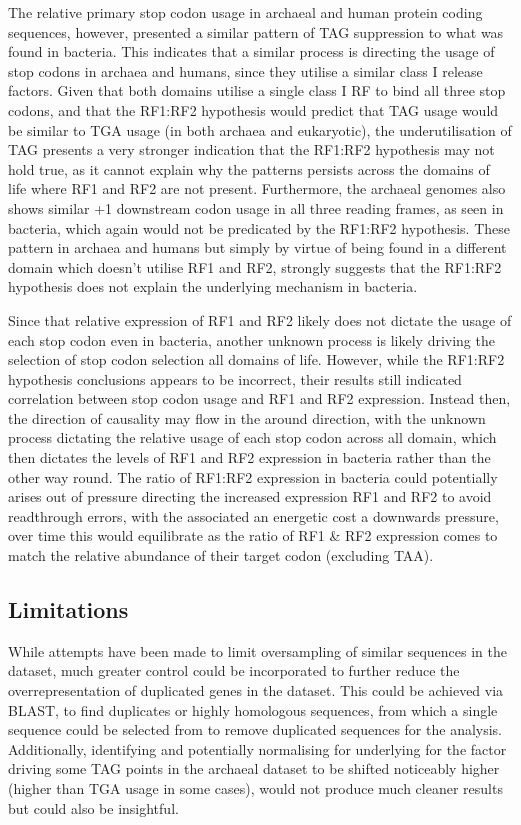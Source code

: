 \documentclass[../main.tex]{subfile}
\begin{document}
    The relative primary stop codon usage in archaeal and human protein coding sequences, however, presented a similar pattern of TAG suppression to what was found in bacteria. This indicates that a similar process is directing the usage of stop codons in archaea and humans, since they utilise a similar class I release factors. Given that both domains utilise a single class I RF to bind all three stop codons, and that the RF1:RF2 hypothesis would predict that TAG usage would be similar to TGA usage (in both archaea and eukaryotic), the underutilisation of TAG presents a very stronger indication that the RF1:RF2 hypothesis may not hold true, as it cannot explain why the patterns persists across the domains of life where RF1 and RF2 are not present.
    Furthermore, the archaeal genomes also shows similar +1 downstream codon usage in all three reading frames, as seen in bacteria, which again would not be predicated by the RF1:RF2 hypothesis.
    These pattern in archaea and humans but simply by virtue of being found in a different domain which doesn't utilise RF1 and RF2, strongly suggests that the RF1:RF2 hypothesis does not explain the underlying mechanism in bacteria.

    Since that relative expression of RF1 and RF2 likely does not dictate the usage of each stop codon even in bacteria, another unknown process is likely driving the selection of stop codon selection all domains of life. However, while the RF1:RF2 hypothesis conclusions appears to be incorrect, their results still indicated correlation between stop codon usage and RF1 and RF2 expression. Instead then, the direction of causality may flow in the around direction, with the unknown process dictating the relative usage of each stop codon across all domain, which then dictates the levels of RF1 and RF2 expression in bacteria rather than the other way round. The ratio of RF1:RF2 expression in bacteria could potentially arises out of pressure directing the increased expression RF1 and RF2 to avoid readthrough errors, with the associated an energetic cost a downwards pressure, over time this would equilibrate as the ratio of RF1 \& RF2 expression comes to match the relative abundance of their target codon (excluding TAA).

    \subsection{Limitations}
        While attempts have been made to limit oversampling of similar sequences in the dataset, much greater control could be incorporated to further reduce the overrepresentation of duplicated genes in the dataset. This could be achieved via BLAST, to find duplicates or highly homologous sequences, from which a single sequence could be selected from to remove duplicated sequences for the analysis.
        Additionally, identifying and potentially normalising for underlying for the factor driving some TAG points in the archaeal dataset to be shifted noticeably higher (higher than TGA usage in some cases), would not produce much cleaner results but could also be insightful.
\end{document}
